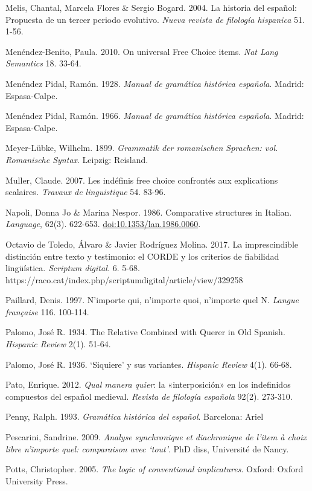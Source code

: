 \documentclass[output=paper]{langscibook}
\begin{document}
Melis, Chantal, Marcela Flores \& Sergio Bogard. 2004. La historia del español: Propuesta de un tercer periodo evolutivo. \textit{Nueva revista de filología hispanica} 51. 1-56.

Menéndez-Benito, Paula. 2010. On universal Free Choice items. \textit{Nat Lang Semantics} 18. 33-64.

Menéndez Pidal, Ramón. 1928. \textit{Manual de gramática histórica española}. Madrid: Espasa-Calpe.

Menéndez Pidal, Ramón. 1966. \textit{Manual de gramática histórica española}. Madrid: Espasa-Calpe.

Meyer-Lübke, Wilhelm. 1899. \textit{Grammatik der romanischen Sprachen: vol. Romanische Syntax}. Leipzig: Reisland.

Muller, Claude. 2007. Les indéfinis free choice confrontés aux explications scalaires\textit{. Travaux de linguistique} 54. 83-96.

Napoli, Donna Jo \& Marina Nespor. 1986. Comparative structures in Italian. \textit{Language}, 62(3). 622-653. \href{http://doi.org/10.1353/lan.1986.0060}{{doi:10.1353/lan.1986.0060}}.

Octavio de Toledo, Álvaro \& Javier Rodríguez Molina. 2017. La imprescindible distinción entre texto y testimonio: el CORDE y los criterios de fiabilidad lingüística. \textit{Scriptum digital.} 6. 5-68. https://raco.cat/index.php/scriptumdigital/article/view/329258

Paillard, Denis. 1997. N’importe qui, n’importe quoi, n’importe quel N. \textit{Langue française} 116. 100-114.

Palomo, José R. 1934. The Relative Combined with Querer in Old Spanish. \textit{Hispanic Review} 2(1). 51-64. 

Palomo, José R. 1936. ‘Siquiere’ y sus variantes. \textit{Hispanic Review} 4(1). 66-68.

Pato, Enrique. 2012. \textit{Qual manera quier}: la «interposición» en los indefinidos compuestos del español medieval. \textit{Revista de filología española} 92(2). 273-310.

Penny, Ralph. 1993. \textit{Gramática histórica del español}. Barcelona: Ariel

Pescarini, Sandrine. 2009. \textit{Analyse synchronique et diachronique de l'item à choix libre n'importe quel: comparaison avec ‘tout’}. PhD diss, Université de Nancy.

\begin{styleLiteraturStandard}
Potts, Christopher. 2005. \textit{The logic of conventional implicatures}. Oxford: Oxford University Press.
\end{styleLiteraturStandard}
\end{document}
